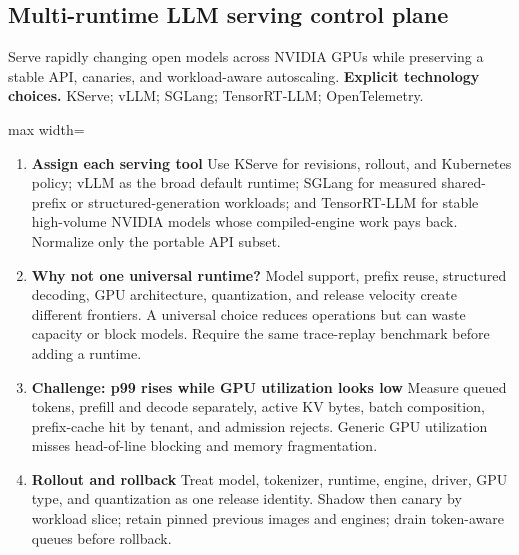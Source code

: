 \subsection{Multi-runtime LLM serving control plane}
Serve rapidly changing open models across NVIDIA GPUs while preserving a stable API, canaries, and workload-aware autoscaling.
\textbf{Explicit technology choices.} KServe; vLLM; SGLang; TensorRT-LLM; OpenTelemetry.
\begin{center}\begin{adjustbox}{max width=\linewidth}\end{adjustbox}\end{center}
\begin{enumerate}
\item \textbf{Assign each serving tool} Use KServe for revisions, rollout, and Kubernetes policy; vLLM as the broad default runtime; SGLang for measured shared-prefix or structured-generation workloads; and TensorRT-LLM for stable high-volume NVIDIA models whose compiled-engine work pays back. Normalize only the portable API subset.
\item \textbf{Why not one universal runtime?} Model support, prefix reuse, structured decoding, GPU architecture, quantization, and release velocity create different frontiers. A universal choice reduces operations but can waste capacity or block models. Require the same trace-replay benchmark before adding a runtime.
\item \textbf{Challenge: p99 rises while GPU utilization looks low} Measure queued tokens, prefill and decode separately, active KV bytes, batch composition, prefix-cache hit by tenant, and admission rejects. Generic GPU utilization misses head-of-line blocking and memory fragmentation.
\item \textbf{Rollout and rollback} Treat model, tokenizer, runtime, engine, driver, GPU type, and quantization as one release identity. Shadow then canary by workload slice; retain pinned previous images and engines; drain token-aware queues before rollback.
\end{enumerate}
